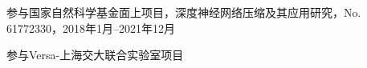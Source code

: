 

\begin{projects}
  \item 参与国家自然科学基金面上项目，深度神经网络压缩及其应用研究，No. 61772330，2018年1月--2021年12月
  \item 参与Versa-上海交大联合实验室项目
\end{projects}

\begin{projects*}
\end{projects*}

